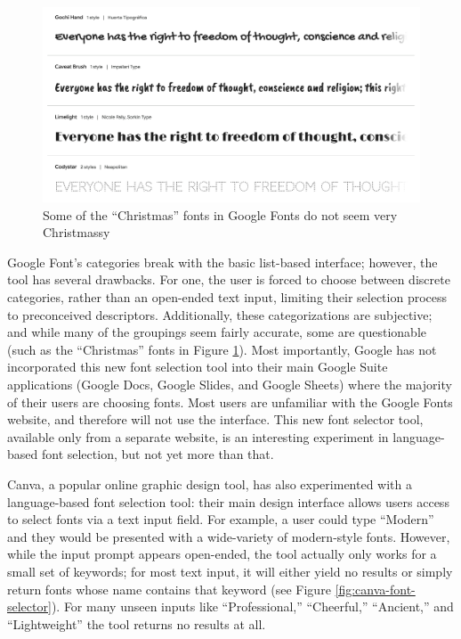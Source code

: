 \begin{figure}
    \centering
    \includegraphics[width=1\textwidth]{images/google-fonts-christmas.png}
    \caption{Some of the ``Christmas'' fonts in Google Fonts do not seem very Christmassy}
    \label{fig:google-fonts-christmas}
\end{figure}

Google Font's categories break with the basic list-based interface; however, the tool has several drawbacks. For one, the user is forced to choose between discrete categories, rather than an open-ended text input, limiting their selection process to preconceived descriptors. Additionally, these categorizations are subjective; and while many of the groupings seem fairly accurate, some are questionable (such as the ``Christmas'' fonts in Figure \ref{fig:google-fonts-christmas}). Most importantly, Google has not incorporated this new font selection tool into their main Google Suite applications (Google Docs, Google Slides, and Google Sheets) where the majority of their users are choosing fonts. Most users are unfamiliar with the Google Fonts website, and therefore will not use the interface. This new font selector tool, available only from a separate website, is an interesting experiment in language-based font selection, but not yet more than that.

Canva, a popular online graphic design tool, has also experimented with a language-based font selection tool: their main design interface allows users access to select fonts via a text input field. For example, a user could type ``Modern'' and they would be presented with a wide-variety of modern-style fonts. However, while the input prompt appears open-ended, the tool actually only works for a small set of keywords; for most text input, it will either yield no results or simply return fonts whose name contains that keyword (see Figure \ref{fig:canva-font-selector}). For many unseen inputs like ``Professional,'' ``Cheerful,'' ``Ancient,'' and ``Lightweight'' the tool returns no results at all.


